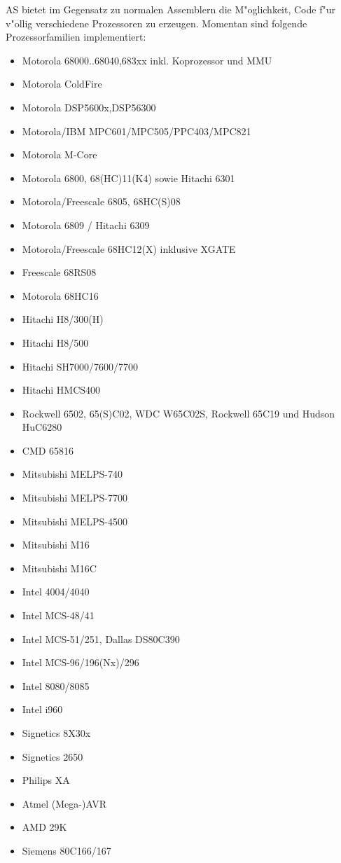 \documentclass[12pt,a4paper,twoside]{report}
\begin{document}
AS bietet im Gegensatz zu normalen Assemblern die M"oglichkeit, Code
f"ur v"ollig verschiedene Prozessoren zu erzeugen.  Momentan sind
folgende Prozessorfamilien implementiert:
\begin{itemize}
\item{Motorola 68000..68040,683xx inkl. Koprozessor und MMU}
\item{Motorola ColdFire}
\item{Motorola DSP5600x,DSP56300}
\item{Motorola/IBM MPC601/MPC505/PPC403/MPC821}
\item{Motorola M-Core}
\item{Motorola 6800, 68(HC)11(K4) sowie Hitachi 6301}
\item{Motorola/Freescale 6805, 68HC(S)08}
\item{Motorola 6809 / Hitachi 6309}
\item{Motorola/Freescale 68HC12(X) inklusive XGATE}
\item{Freescale 68RS08}
\item{Motorola 68HC16}
\item{Hitachi H8/300(H)}
\item{Hitachi H8/500}
\item{Hitachi SH7000/7600/7700}
\item{Hitachi HMCS400}
\item{Rockwell 6502, 65(S)C02, WDC W65C02S, Rockwell 65C19 und
      Hudson HuC6280}
\item{CMD 65816}
\item{Mitsubishi MELPS-740}
\item{Mitsubishi MELPS-7700}
\item{Mitsubishi MELPS-4500}
\item{Mitsubishi M16}
\item{Mitsubishi M16C}
\item{Intel 4004/4040}
\item{Intel MCS-48/41}
\item{Intel MCS-51/251, Dallas DS80C390}
\item{Intel MCS-96/196(Nx)/296}
\item{Intel 8080/8085}
\item{Intel i960}
\item{Signetics 8X30x}
\item{Signetics 2650}
\item{Philips XA}
\item{Atmel (Mega-)AVR}
\item{AMD 29K}
\item{Siemens 80C166/167}

\end{itemize}
\end{document}
